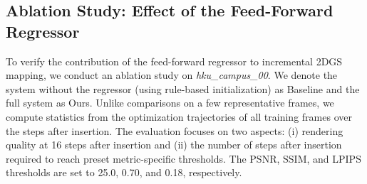 \documentclass[letterpaper, 10pt, conference]{ieeeconf}
\newcommand{\datasetname}[1]{\mbox{\normalfont\itshape #1}}
\begin{document}
\begin{table}[!t]
\centering
\caption{Ablation results on \datasetname{hku\_campus\_00}. Statistics are computed over the optimization trajectories of all training frames. Part (a) reports rendering quality at 16 steps after insertion; Part (b) reports the mean $\pm$ std steps after insertion required to reach preset quality thresholds.}
\label{tab:ablation_regressor}
\renewcommand{\arraystretch}{1.18}
\end{table}

\subsection{Ablation Study: Effect of the Feed-Forward Regressor}

To verify the contribution of the feed-forward regressor to incremental 2DGS mapping, we conduct an ablation study on \datasetname{hku\_campus\_00}. We denote the system without the regressor (using rule-based initialization) as Baseline and the full system as Ours. Unlike comparisons on a few representative frames, we compute statistics from the optimization trajectories of all training frames over the steps after insertion. The evaluation focuses on two aspects: (i) rendering quality at 16 steps after insertion and (ii) the number of steps after insertion required to reach preset metric-specific thresholds. The PSNR, SSIM, and LPIPS thresholds are set to 25.0, 0.70, and 0.18, respectively.
\end{document}
